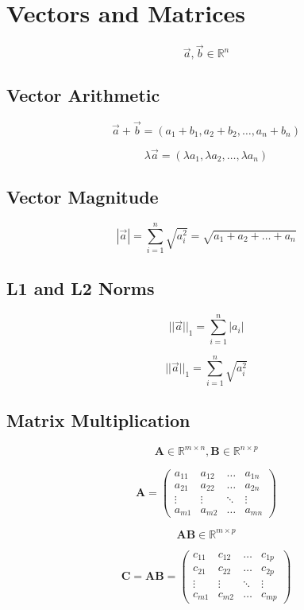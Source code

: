 \documentclass[a4paper]{article}
\begin{document}
\section{Vectors and Matrices}

$$ \vec{a}, \vec{b} \in \mathbb{R}^n $$

\subsection{Vector Arithmetic}

$$ \vec{a} + \vec{b} = (a_1+b_1, a_2+b_2, \ldots, a_n+b_n) $$

$$ \lambda\vec{a} = (\lambda a_1, \lambda a_2,\ldots, \lambda a_n) $$

\subsection{Vector Magnitude}

$$ |\vec{a}| = \sum_{i=1}^{n}\sqrt{a_i^2} = \sqrt{a_1 + a_2 + \ldots + a_n} $$

\subsection{L1 and L2 Norms}

$$ ||\vec{a}||_1 = \sum_{i=1}^{n} |a_i| $$

$$ ||\vec{a}||_1 = \sum_{i=1}^{n} \sqrt{a_i^2} $$

\subsection{Matrix Multiplication}

$$ \mathbf{A} \in \mathbb{R}^{m \times n}, \mathbf{B} \in \mathbb{R}^{n \times p} $$

$$ \mathbf{A} = 
\begin{pmatrix}
a_{11} & a_{12} & \ldots & a_{1n} \\
a_{21} & a_{22} & \ldots & a_{2n} \\
\vdots & \vdots & \ddots & \vdots \\
a_{m1} & a_{m2} & \ldots & a_{mn}
\end{pmatrix}
$$

$$ \mathbf{AB} \in \mathbb{R}^{m \times p} $$

$$ \mathbf{C} = \mathbf{AB} = 
\begin{pmatrix}
c_{11} & c_{12} & \ldots & c_{1p} \\
c_{21} & c_{22} & \ldots & c_{2p} \\
\vdots & \vdots & \ddots & \vdots \\
c_{m1} & c_{m2} & \ldots & c_{mp}
\end{pmatrix}
$$
\end{document}
